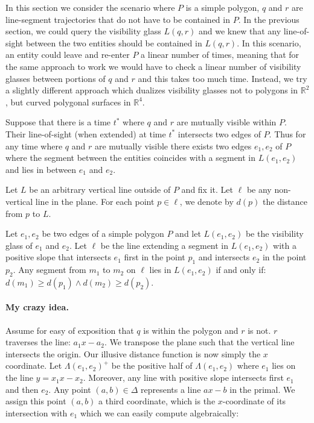 

In this section we consider the scenario where $P$ is a simple polygon, $q$ and $r$ are line-segment trajectories that do not have to be contained in $P$. In the previous section, we could query the visibility glass $L(q,r)$ and we knew that any line-of-sight between the two entities should be contained in $L(q,r)$. In this scenario, an entity could leave and re-enter $P$ a linear number of times, meaning that for the same approach to work we would have to check a linear number of visibility glasses between portions of $q$ and $r$ and this takes too much time. Instead, we try a slightly different approach which dualizes visibility glasses not to polygons in $\mathbb{R}^2$, but curved polygonal surfaces in $\mathbb{R}^4$.

Suppose that there is a time $t^*$ where $q$ and $r$ are mutually visible within $P$. Their line-of-sight (when extended) at time $t^*$ intersects two edges of $P$. Thus for any time where $q$ and $r$ are mutually visible there exists two edges $e_1, e_2$ of $P$ where  the segment between the entities coincides with a segment in $L(e_1, e_2)$ and lies in between $e_1$ and $e_2$.

Let $L$ be an arbitrary vertical line outside of $P$ and fix it. Let $\ell$ be any non-vertical line in the plane. For each point $p \in \ell$, we denote by $d(p)$ the distance from $p$ to $L$.

\begin{lemma}
Let $e_1, e_2$ be two edges of a simple polygon $P$ and let $L(e_1, e_2)$ be the visibility glass of $e_1$ and $e_2$. Let $\ell$ be the line extending a segment in $L(e_1, e_2)$ with a positive slope that intersects $e_1$ first in the point $p_1$ and intersects $e_2$ in the point $p_2$. Any segment from $m_1$ to $m_2$ on $\ell$ lies in $L(e_1, e_2)$ if and only if: $d(m_1) \ge d(p_1) \wedge d(m_2) \ge d(p_2)$.
\end{lemma}

\paragraph{My crazy idea.}
Assume for easy of exposition that $q$ is within the polygon and $r$ is not. $r$ traverses the line: $a_1 x - a_2$. We transpose the plane such that the vertical line intersects the origin. Our illusive distance function is now simply the $x$ coordinate. Let $\Lambda(e_1,e_2)^+$ be the positive half of $\Lambda(e_1, e_2)$ where $e_1$ lies on the line $y = x_1 x - x_2$. Moreover, any line with positive slope intersects first $e_1$ and then $e_2$. Any point $(a,b) \in \Delta$ represents a line $ax - b$ in the primal. We assign this point $(a,b)$ a third coordinate, which is the $x$-coordinate of its intersection with $e_1$ which we can easily compute algebraically:

